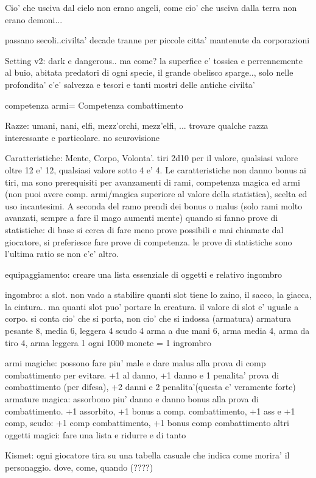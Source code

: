 \documentclass[12pt,a4paper,twoside,openany,twocolumn]{book}
\begin{document}
Cio' che usciva dal cielo non erano angeli, come cio' che usciva dalla terra non erano demoni...

passano secoli..civilta' decade tranne per piccole citta' mantenute da corporazioni


Setting v2: dark e dangerous.. ma come?
la superfice e'  tossica e perrennemente al buio, abitata predatori di ogni specie, il grande obelisco sparge.., solo nelle profondita' c'e' salvezza e tesori e tanti mostri delle antiche civilta'

competenza armi= Competenza combattimento


Razze: umani, nani, elfi, mezz'orchi, mezz'elfi, ... trovare qualche razza interessante e particolare. no scurovisione

Caratteristiche: Mente, Corpo, Volonta'. tiri 2d10 per il valore, qualsiasi valore oltre 12 e' 12, qualsiasi valore sotto 4 e' 4.
Le caratteristiche non danno bonus ai tiri, ma sono prerequisiti per avanzamenti di rami, competenza magica ed armi (non puoi avere comp. armi/magica superiore al valore della statistica), scelta ed uso incantesimi. A seconda del ramo prendi dei bonus o malus (solo rami molto avanzati, sempre a fare il mago aumenti mente)
quando si fanno prove di statistiche: di base si cerca di fare meno prove possibili e mai chiamate dal giocatore, si preferiesce fare prove di competenza. le prove di statistiche sono l'ultima ratio se non c'e' altro.


equipaggiamento: creare una lista essenziale di oggetti e relativo ingombro

ingombro: a slot. non vado a stabilire quanti slot tiene lo zaino, il sacco, la giacca, la cintura.. ma quanti slot puo' portare la creatura. il valore di slot e' uguale a corpo. si conta cio' che si porta, non cio' che si indossa (armatura)
armatura pesante 8, media 6, leggera 4
scudo 4
arma a due mani 6, arma media 4, arma da tiro 4, arma leggera 1
ogni 1000 monete = 1 ingrombro

armi magiche: possono fare piu' male e dare malus alla prova di comp combattimento per evitare. +1 al danno, +1 danno e 1 penalita' prova di combattimento (per difesa), +2 danni e 2 penalita'(questa e' veramente forte)
armature magica: assorbono piu' danno e danno bonus alla prova di combattimento. +1 assorbito, +1 bonus a comp. combattimento, +1 ass e +1 comp, 
scudo: +1 comp combattimento, +1 bonus comp combattimento
altri oggetti magici: fare una lista e ridurre e di tanto

Kismet: ogni giocatore tira su una tabella casuale che indica come morira' il personaggio. dove, come, quando (????)
\end{document}
